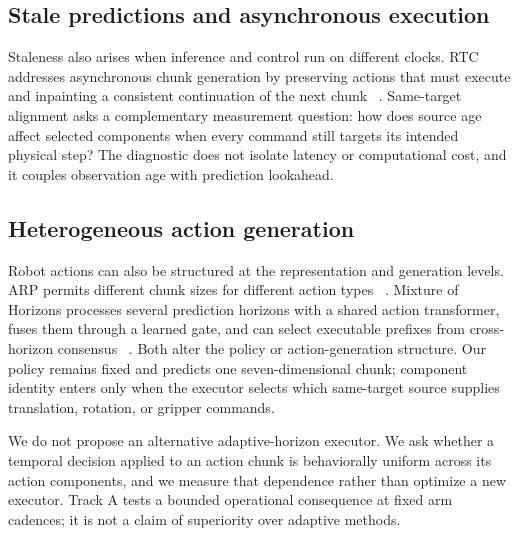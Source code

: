 \subsection{Stale predictions and asynchronous execution}

Staleness also arises when inference and control run on different clocks. RTC
addresses asynchronous chunk generation by preserving actions that must execute
and inpainting a consistent continuation of the next chunk
~\cite{black2025rtc}. Same-target alignment asks a complementary measurement
question: how does source age affect selected components when every command
still targets its intended physical step? The diagnostic does not isolate
latency or computational cost, and it couples observation age with prediction
lookahead.

\subsection{Heterogeneous action generation}

Robot actions can also be structured at the representation and generation
levels. ARP permits different chunk sizes for different action types
~\cite{zhang2025arp}. Mixture of Horizons processes several prediction
horizons with a shared action transformer, fuses them through a learned gate,
and can select executable prefixes from cross-horizon consensus
~\cite{jing2026moh}. Both alter the policy or action-generation structure. Our
policy remains fixed and predicts one seven-dimensional chunk; component
identity enters only when the executor selects which same-target source
supplies translation, rotation, or gripper commands.

We do not propose an alternative adaptive-horizon executor. We ask whether a
temporal decision applied to an action chunk is behaviorally uniform across its
action components, and we measure that dependence rather than optimize a new
executor. Track A tests a bounded operational consequence at fixed arm
cadences; it is not a claim of superiority over adaptive methods.
